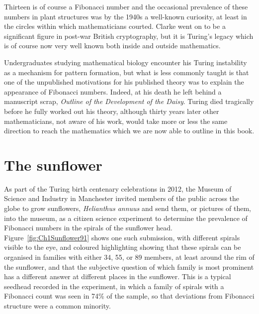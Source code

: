 Thirteen is of course a Fibonacci number and the occasional prevalence of these numbers in plant structures was by the 1940s a well-known curiosity, at least in the circles within which mathematicians courted.
%
Clarke went on to be a significant figure in post-war British cryptography, but it is Turing's legacy which is of course now very well known both inside and outside mathematics.%
	
Undergraduates studying mathematical biology encounter his Turing instability as a mechanism for pattern formation, but what is less commonly taught is that one of the unpublished motivations for his published theory was to explain the appearance of Fibonacci numbers. Indeed, at his death he left behind a manuscript scrap, \textit{Outline of the Development of the Daisy}. Turing died tragically before he fully worked out his theory, although thirty years later other mathematicians, not aware of his work, would take more or less the same direction to reach the mathematics which we are now able to outline in this book. 


\section{The sunflower}

As part of the Turing birth centenary celebrations in 2012, the Museum of Science and Industry in Manchester invited members of the public across the globe to grow sunflowers, \textit{Helianthus annuus} and send them, or pictures of them, into the museum, as a citizen science experiment to determine the prevalence of Fibonacci numbers in the spirals of the sunflower head. Figure~\ref{fig:Ch1Sunflower91} shows one such submission, with different spirals visible to the eye, 
and coloured highlighting showing that these spirals can be organised in families with either 34, 55, or 89 members, at least around the rim of the sunflower, and that the subjective question of which family is most prominent has a different answer at different places in the sunflower.  This is a typical seedhead recorded in the experiment, in which a family of spirals with a Fibonacci count was seen in 74\% of the sample, so that deviations from Fibonacci structure were a common minority.


